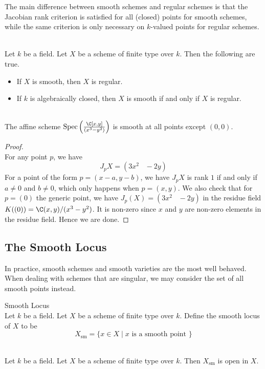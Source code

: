 \documentclass[a4paper]{article}
\begin{document}
The main difference between smooth schemes and regular schemes is that the Jacobian rank criterion is satisfied for all (closed) points for smooth schemes, while the same criterion is only necessary on $k$-valued points for regular schemes. 

\begin{lmm}{}{}\\
Let $k$ be a field. Let $X$ be a scheme of finite type over $k$. Then the following are true. 
\begin{itemize}
\item If $X$ is smooth, then $X$ is regular. 
\item If $k$ is algebraically closed, then $X$ is smooth if and only if $X$ is regular. 
\end{itemize}
\end{lmm}

\begin{eg}{}{}\\
The affine scheme $\text{Spec}\left(\frac{\C[x,y]}{(x^3-y^2)}\right)$ is smooth at all points except $(0,0)$. 
\begin{proof}\\
For any point $p$, we have $$J_pX=(3x^2\;\;\;-2y)$$ For a point of the form $p=(x-a,y-b)$, we have $J_pX$ is rank $1$ if and only if $a\neq 0$ and $b\neq 0$, which only happens when $p=(x,y)$. We also check that for $p=(0)$ the generic point, we have $J_p(X)=(3x^2\;\;\;-2y)$ in the residue field $K((0))=\C(x,y)/(x^3-y^2)$. It is non-zero since $x$ and $y$ are non-zero elements in the residue field. Hence we are done. 
\end{proof}
\end{eg}

\subsection{The Smooth Locus}
In practice, smooth schemes and smooth varieties are the most well behaved. When dealing with schemes that are singular, we may consider the set of all smooth points instead. 

\begin{defn}{Smooth Locus}{}\\
Let $k$ be a field. Let $X$ be a scheme of finite type over $k$. Define the smooth locus of $X$ to be $$X_\text{sm}=\{x\in X\;|\;x\text{ is a smooth point }\}$$
\end{defn}

\begin{prp}{}{}\\
Let $k$ be a field. Let $X$ be a scheme of finite type over $k$. Then $X_\text{sm}$ is open in $X$. 
\end{prp}
\end{document}
